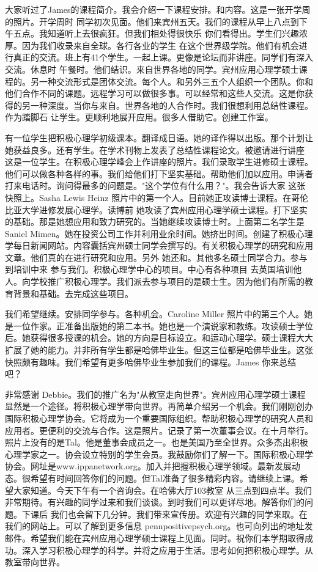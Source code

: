 大家听过了James的课程简介。我会介绍一下课程安排。和内容。这是一张开学周的照片。开学周时 同学初次见面。他们来宾州五天。我们的课程从早上八点到下午五点。我知道听上去很疯狂。但我们相处得很快乐 你们看得出。学生们兴趣浓厚。因为我们收录来自全球。各行各业的学生 在这个世界级学院。他们有机会进行真正的交流。班上有41个学生。一起上课。更像是论坛而非讲座。同学们有深入交流。休息时 午餐时。他们结识。来自世界各地的同学。宾州应用心理学硕士课程的。另一种交流形式是团体交流。每个人。和另外三五个人组织一个团队。你和他们合作不同的课题。远程学习可以做很多事。可以经常和这些人交流。这是你获得的另一种深度。当你与来自。世界各地的人合作时。我们很想利用总结性课程。作为踏脚石 让学生。更顺利地展开应用。很多人借助它。创建工作室。 

有一位学生把积极心理学初级课本。翻译成日语。她的译作得以出版。那个计划让她获益良多。还有学生。在学术刊物上发表了总结性课程论文。被邀请进行讲座 这是一位学生。在积极心理学峰会上作讲座的照片。我们录取学生进修硕士课程。他们可以做各种各样的事。我们给他们打下坚实基础。帮助他们加以应用。申请者打来电话时。询问得最多的问题是。"这个学位有什么用？"。我会告诉大家 这张快照上。Sasha Lewis Heinz 照片中的第一个人。目前她正攻读博士课程。在哥伦比亚大学进修发展心理学。读博前 她攻读了宾州应用心理学硕士课程。打下坚实的基础。那是她想应用和致力研究的。当她继续攻读博士时。上面第二名学生是Saniel Mimen。她在投资公司工作并利用业余时间。她挤出时间。创建了积极心理学每日新闻网站。内容囊括宾州硕士同学会撰写的。有关积极心理学的研究和应用文章。他们真的在进行研究和应用。另外 她还和。其他多名硕士同学合力。参与到培训中来 参与我们。积极心理学中心的项目。中心有各种项目 去英国培训他人。向学校推广积极心理学。我们派去参与项目的是硕士生。因为他们有所需的教育背景和基础。去完成这些项目。 

我们希望继续。安排同学参与。各种机会。Caroline Miller 照片中的第三个人。她是一位作家。正准备出版她的第二本书。她也是一个演说家和教练。攻读硕士学位后。她获得很多授课的机会。她的方向是目标设立。和运动心理学。硕士课程大大扩展了她的能力。并非所有学生都是哈佛毕业生。但这三位都是哈佛毕业生。这张快照颇有趣味。我们希望有更多哈佛毕业生参加我们的课程。James 你来总结吧？ 

非常感谢 Debbie。我们的推广名为"从教室走向世界"。宾州应用心理学硕士课程显然是一个途径。将积极心理学带向世界。再简单介绍另一个机会。我们刚刚创办国际积极心理学协会。它将成为一个重要国际组织。帮助积极心理学的研究人员和应用者。更便利的交流与合作。这是照片。记录了第一次董事会议。在十月举行。照片上没有的是Tal。他是董事会成员之一。也是美国乃至全世界。众多杰出积极心理学家之一。协会设立特别的学生会员。我鼓励你们了解一下。国际积极心理学协会。网址是www.ippanetwork.org。加入并把握积极心理学领域。最新发展动态。很希望有时间回答你们的问题。但Tal准备了很多精彩内容。请继续上课。希望大家知道。今天下午有一个咨询会。在哈佛大厅103教室 从三点到四点半。我们非常期待。有兴趣的同学过来和我们谈谈。到时我们可以更详尽地。解答你们的问题。下课后 我们也会留下几分钟。我们带来宣传册。欢迎有兴趣的同学来取。在我们的网站上。可以了解到更多信息 pennpositivepsych.org。也可向列出的地址发邮件。希望我们能在宾州应用心理学硕士课程上见面。同时。祝你们本学期取得成功。深入学习积极心理学的科学。并将之应用于生活。思考如何把积极心理学。从教室带向世界。 

